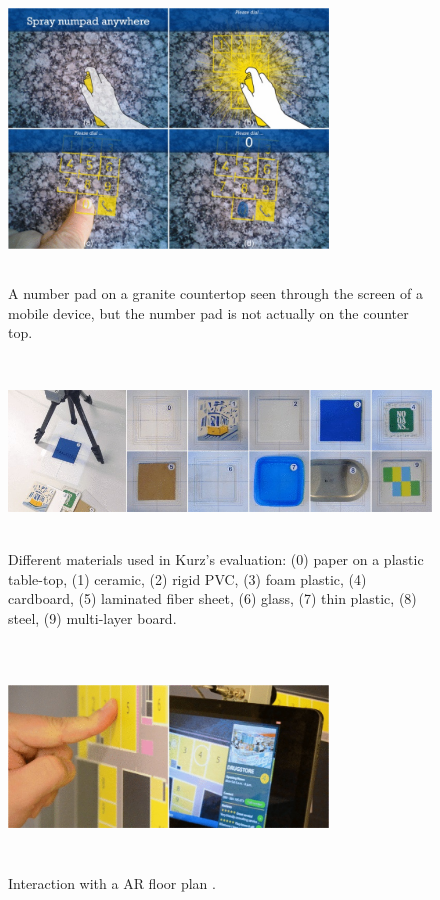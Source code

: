 \documentclass{sig-alternate}
\begin{document}
\begin{figure}
	\includegraphics[width=8.5cm, height=8cm]{numpad}
	\caption{A number pad on a granite countertop seen through the screen of a mobile device, but the number pad is not actually on the counter top. \cite{Thermal}}
	\label{fig:numpad}
\end{figure}

\begin{figure}
	\includegraphics[width=18cm, height=5cm]{ThermalTesting}
	\caption{Different materials used in Kurz's evaluation: (0) paper on a plastic table-top, (1) ceramic, (2) rigid PVC, (3) foam plastic, (4) cardboard, (5) laminated fiber sheet, (6) glass, (7) thin plastic, (8) steel, (9) multi-layer board. \cite{Thermal}}
	\label{fig:ThermalTest}
\end{figure}

\begin{figure}
	\includegraphics[width=8.5cm, height=6cm]{AugmentedFloorPlans}
	\caption{Interaction with a AR floor plan \cite{Thermal}.}
	\label{fig:FloorPlan}
\end{figure}
\end{document}
